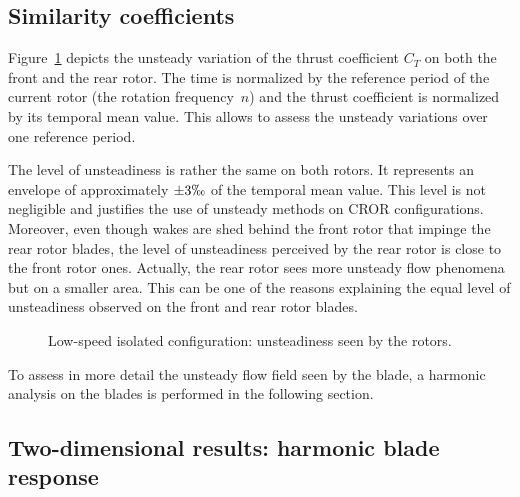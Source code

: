 
\subsection{Similarity coefficients}
\label{sub:dream_ls_hb_sim_coeff}

Figure~\ref{fig:dream_ls_hb_unst_coeff} depicts the
unsteady variation of the thrust coefficient $C_T$ on 
both the front and the rear rotor.
The time is 
normalized by the reference period of the current rotor 
(the rotation frequency~$n$) and the thrust coefficient is normalized
by its temporal mean value. This allows to assess the unsteady variations
over one reference period. 

The level of unsteadiness is rather
the same on both rotors. It represents an envelope of approximately
$\pm 3\permil$ of the temporal mean value. This level is not negligible and
justifies the use of unsteady methods on CROR configurations. 
Moreover, even though wakes are shed behind the front rotor
that impinge the rear rotor blades, the level of unsteadiness
perceived by the rear rotor is close to the front rotor ones.
Actually, the rear rotor sees more unsteady flow
phenomena but on a smaller area. This can be one of the reasons
explaining the equal level of
unsteadiness observed on the front and rear rotor blades.
\begin{figure}[htp]
  \centering
  \caption{Low-speed isolated configuration: unsteadiness seen by the rotors.}
  \label{fig:dream_ls_hb_unst_coeff}
\end{figure}

To assess in more detail the unsteady flow
field seen by the blade, a harmonic analysis on the
blades is performed in the following section.

\subsection{Two-dimensional results: harmonic blade response}
\label{sub:dream_ls_hb_blade_response}

